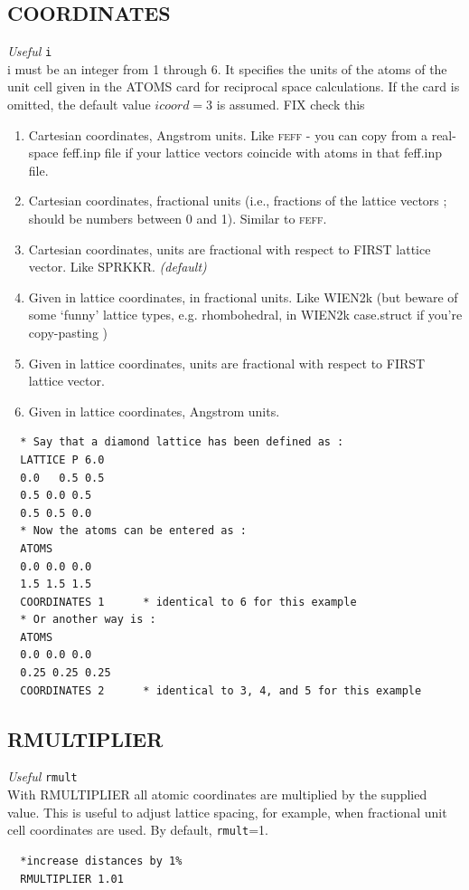 \documentclass[11pt,oneside]{report} %
\newcommand{\program}[1]{\textsc{#1}}
\newcommand{\feff}{\program{feff}}
\newenvironment{Card}[4]%
      {\vspace{3ex}%
        \subsection{#1}
        \quad\textsl{#3}\newline
        \quad\texttt{#2}\newline%
        \label{card:#4}\\}
      {}
\begin{document}
\begin{Card}{COORDINATES}{i}{Useful}{coo}
  i must be an integer from 1 through 6.  It specifies the units of the atoms of the unit cell given in the ATOMS card for reciprocal space calculations.    
  If the card is omitted, the default value $icoord=3$ is assumed. FIX check this
  \begin{enumerate}
  \item Cartesian coordinates, Angstrom units.  Like {\feff} - you can copy from a real-space feff.inp file if your lattice vectors coincide with atoms in that feff.inp file.
  \item Cartesian coordinates, fractional units (i.e., fractions of the lattice vectors ; should be numbers between 0 and 1).  Similar to {\feff}.
  \item Cartesian coordinates, units are fractional with respect to FIRST lattice vector.  Like SPRKKR. \emph{(default)}
  \item Given in lattice coordinates, in fractional units.  Like WIEN2k (but beware of some `funny' lattice types, e.g. rhombohedral, in WIEN2k case.struct if you're copy-pasting )
  \item Given in lattice coordinates, units are fractional with respect to FIRST lattice vector.
  \item Given in lattice coordinates, Angstrom units.
  \end{enumerate}
\begin{verbatim}
  * Say that a diamond lattice has been defined as :
  LATTICE P 6.0
  0.0	0.5 0.5
  0.5 0.0 0.5
  0.5 0.5 0.0
  * Now the atoms can be entered as :
  ATOMS
  0.0 0.0 0.0
  1.5 1.5 1.5
  COORDINATES 1      * identical to 6 for this example
  * Or another way is :
  ATOMS
  0.0 0.0 0.0
  0.25 0.25 0.25
  COORDINATES 2      * identical to 3, 4, and 5 for this example
\end{verbatim}
\end{Card}



\begin{Card}{RMULTIPLIER}{rmult}{Useful}{rmu}
  With RMULTIPLIER all atomic coordinates are multiplied by the
  supplied value. This is useful to adjust lattice spacing, for
  example, when fractional unit cell coordinates are used. By
  default, \texttt{rmult}=1.
\begin{verbatim}
  *increase distances by 1%
  RMULTIPLIER 1.01
\end{verbatim}
\end{Card}
\end{document}
